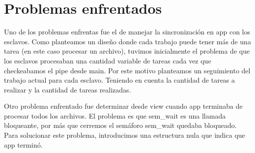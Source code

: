 \documentclass{article}
\begin{document}
\section{Problemas enfrentados}

Uno de los problemas enfrentas fue el de manejar la sincronización en app con los esclavos. Como planteamos un diseño donde cada trabajo puede tener más de una tarea (en este caso procesar un archivo), tuvimos inicialmente el problema de que los esclavos procesaban una cantidad variable de tareas cada vez que checkeabamos el pipe desde main. Por este motivo planteamos un seguimiento del trabajo actual para cada esclavo. Teniendo en cuenta la cantidad de tareas a realizar y la cantidad de tareas realizadas.

Otro problema enfrentado fue determinar desde view cuando app terminaba de procesar todos los archivos. El problema es que sem\_wait es una llamada bloqueante, por más que cerremos el semáforo sem\_wait quedaba bloqueado. Para solucionar este problema, introducimos una estructura nula que indica que app terminó. 
\end{document}
